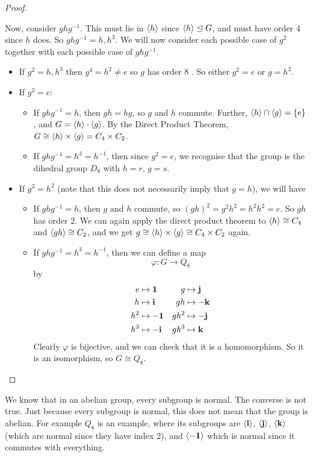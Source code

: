 \documentclass{article}
\begin{document}
\begin{proof}
\begin{itemize}
		      Now, consider $ghg^{-1}$. This must lie in $\langle h \rangle$ since $\langle h \rangle \trianglelefteq G$, and must have order 4 since $h$ does. So $ghg^{-1} = h, h^3$. We will now consider each possible case of $g^2$ together with each possible case of $ghg^{-1}$.
		      \begin{itemize}
			      \item If $g^2 = h, h^3$ then $g^4 = h^2 \neq e$ so $g$ has order 8 \contradiction. So either $g^2 = e$ or $g=h^2$.
			      \item If $g^2 = e$:
			            \begin{itemize}
				            \item If $ghg^{-1} = h$, then $gh = hg$, so $g$ and $h$ commute. Further, $\langle h \rangle \cap \langle g \rangle = \{ e \}$, and $G = \langle h \rangle \cdot \langle g \rangle$. By the Direct Product Theorem, $G \cong \langle h \rangle \times \langle g \rangle = C_4 \times C_2$.
				            \item If $ghg^{-1} = h^3 = h^{-1}$, then since $g^2 = e$, we recognise that the group is the dihedral group $D_8$ with $h=r$, $g=s$.
			            \end{itemize}
			      \item If $g^2 = h^2$ (note that this does not necessarily imply that $g=h$), we will have
			            \begin{itemize}
				            \item If $ghg^{-1} = h$, then $g$ and $h$ commute, so $(gh)^2 = g^2h^2 = h^2h^2 = e$. So $gh$ has order 2. We can again apply the direct product theorem to $\langle h \rangle \cong C_4$ and $\langle gh \rangle \cong C_2$, and we get $g \cong \langle h \rangle \times \langle g \rangle \cong C_4 \times C_2$ again.
				            \item If $ghg^{-1} = h^3 = h^{-1}$, then we can define a map
				                  \[ \varphi \colon G \to Q_8 \]
				                  by
				                  \begin{align*}
					                  e   & \mapsto \vb 1  & g    & \mapsto \vb j  \\
					                  h   & \mapsto \vb i  & gh   & \mapsto -\vb k \\
					                  h^2 & \mapsto -\vb 1 & gh^2 & \mapsto -\vb j \\
					                  h^3 & \mapsto -\vb i & gh^3 & \mapsto \vb k
				                  \end{align*}
				                  Clearly $\varphi$ is bijective, and we can check that it is a homomorphism. So it is an isomorphism, so $G \cong Q_8$.
			            \end{itemize}
		      \end{itemize}
	\end{itemize}
\end{proof}
\begin{remark}
	We know that in an abelian group, every subgroup is normal. The converse is not true. Just because every subgroup is normal, this does not mean that the group is abelian. For example $Q_8$ is an example, where its subgroups are $\langle \vb i \rangle$, $\langle \vb j \rangle$, $\langle \vb k \rangle$ (which are normal since they have index 2), and $\langle -\vb 1 \rangle$ which is normal since it commutes with everything.
\end{remark}
\end{document}
